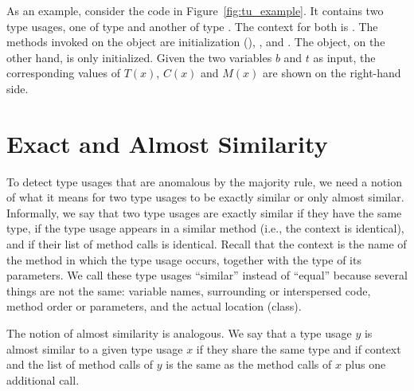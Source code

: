 As an example, consider the code in Figure~\ref{fig:tu_example}.
It contains two type usages, one of type  and another of type .
The context for both is .
The methods invoked on the  object are initialization (), , and .
The  object, on the other hand, is only initialized.
Given the two variables $b$ and $t$ as input, the corresponding values of $T(x)$, $C(x)$ and $M(x)$ are shown on the right-hand side.

\section{Exact and Almost Similarity}

To detect type usages that are anomalous by the majority rule, we need a notion of what it means for two type usages to be exactly similar or only almost similar.
Informally, we say that two type usages are exactly similar if they have the same type, if the type usage appears in a similar method (i.e., the context is identical), and if their list of method calls is identical.
Recall that the context is the name of the method in which the type usage occurs, together with the type of its parameters.
We call these type usages ``similar'' instead of ``equal'' because several things are not the same: variable names, surrounding or interspersed code, method order or parameters, and the actual location (class).

The notion of almost similarity is analogous.
We say that a type usage $y$ is almost similar to a given type usage $x$ if they share the same type and if context and the list of method calls of $y$ is the same as the method calls of $x$ plus one additional call.

